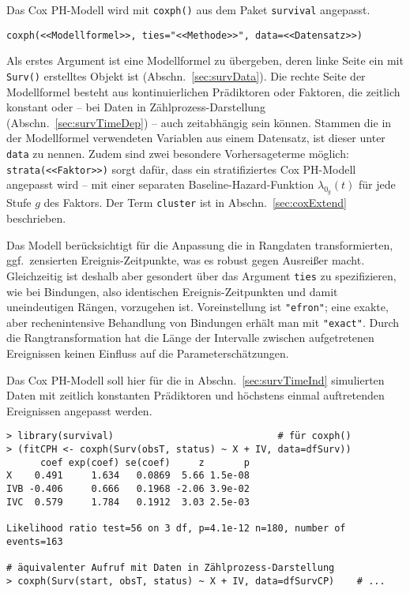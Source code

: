 Das Cox PH-Modell wird mit \lstinline!coxph()! aus dem Paket \lstinline!survival! angepasst.
\begin{lstlisting}
coxph(<<Modellformel>>, ties="<<Methode>>", data=<<Datensatz>>)
\end{lstlisting}

Als erstes Argument ist eine Modellformel zu übergeben, deren linke Seite ein mit \lstinline!Surv()! erstelltes Objekt ist (Abschn.\ \ref{sec:survData}). Die rechte Seite der Modellformel besteht aus kontinuierlichen Prädiktoren oder Faktoren, die zeitlich konstant oder -- bei Daten in Zählprozess-Darstellung (Abschn.\ \ref{sec:survTimeDep}) -- auch zeitabhängig sein können. Stammen die in der Modellformel verwendeten Variablen aus einem Datensatz, ist dieser unter \lstinline!data! zu nennen. Zudem sind zwei besondere Vorhersageterme möglich: \lstinline!strata(<<Faktor>>)! sorgt dafür, dass ein stratifiziertes Cox PH-Modell angepasst wird -- mit einer separaten Baseline-Hazard-Funktion $\lambda_{0_{g}}(t)$ für jede Stufe $g$ des Faktors. Der Term \lstinline!cluster! ist in Abschn.\ \ref{sec:coxExtend} beschrieben.

Das Modell berücksichtigt für die Anpassung die in Rangdaten transformierten, ggf.\ zensierten Ereignis-Zeitpunkte, was es robust gegen Ausreißer macht. Gleichzeitig ist deshalb aber gesondert über das Argument \lstinline!ties! zu spezifizieren, wie bei Bindungen, also identischen Ereignis-Zeitpunkten und damit uneindeutigen Rängen, vorzugehen ist. Voreinstellung ist \lstinline!"efron"!; eine exakte, aber rechenintensive Behandlung von Bindungen erhält man mit \lstinline!"exact"!. Durch die Rangtransformation hat die Länge der Intervalle zwischen aufgetretenen Ereignissen keinen Einfluss auf die Parameterschätzungen.

\label{sec:survCPHres}
Das Cox PH-Modell soll hier für die in Abschn.\ \ref{sec:survTimeInd} simulierten Daten mit zeitlich konstanten Prädiktoren und höchstens einmal auftretenden Ereignissen angepasst werden.
\begin{lstlisting}
> library(survival)                             # für coxph()
> (fitCPH <- coxph(Surv(obsT, status) ~ X + IV, data=dfSurv))
      coef exp(coef) se(coef)     z       p
X    0.491     1.634   0.0869  5.66 1.5e-08
IVB -0.406     0.666   0.1968 -2.06 3.9e-02
IVC  0.579     1.784   0.1912  3.03 2.5e-03

Likelihood ratio test=56 on 3 df, p=4.1e-12 n=180, number of events=163

# äquivalenter Aufruf mit Daten in Zählprozess-Darstellung
> coxph(Surv(start, obsT, status) ~ X + IV, data=dfSurvCP)    # ...
\end{lstlisting}

